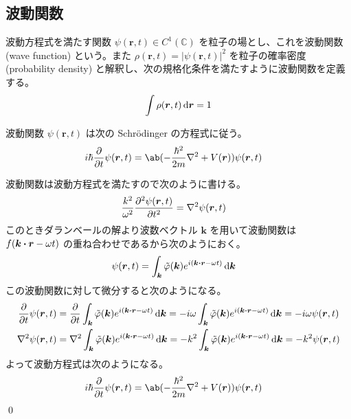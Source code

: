 \documentclass[uplatex,dvipdfmx,a4paper,11pt]{jlreq}
\makeatletter
\newcommand{\CC}{\mathbb{C}}
\newcommand{\rr}{\bm{r}}
\newcommand{\kk}{\bm{k}}
\numberwithin{equation}{section}
\theoremstyle{definition}
\renewenvironment{proof}[1][\proofname]{\par
  \normalfont
  \topsep6\p@\@plus6\p@ \trivlist
  \item[\hskip\labelsep{\bfseries #1}\@addpunct{\bfseries}]\ignorespaces\quad\par
}{%
  \qed\endtrivlist\@endpefalse
}
\renewcommand\proofname{証明}
\makeatother
\begin{document}
\subsection{波動関数}
\begin{definition}[波動関数]
  波動方程式を満たす関数 $\psi(\rr, t)\in C^1(\CC)$ を粒子の場とし、これを波動関数 (wave function) という。また $\rho(\rr, t) = |\psi(\rr, t)|^2$ を粒子の確率密度 (probability density) と解釈し、次の規格化条件を満たすように波動関数を定義する。
  \begin{align}
    \int\rho(\rr, t)\dl{\rr} = 1
  \end{align}
\end{definition}
\begin{theorem}
  波動関数 $\psi(\rr, t)$ は次の Schrödinger の方程式に従う。
  \begin{align}
    i\hbar\diffp{}{t}\psi(\rr, t) & = \ab(-\frac{\hbar^2}{2m}\nabla^2 + V(\rr))\psi(\rr, t)
  \end{align}
\end{theorem}
\begin{proof}
  波動関数は波動方程式を満たすので次のように書ける。
  \begin{align}
    \frac{k^2}{\omega^2}\pdv[2]{\psi(\rr, t)}{t} & = \nabla^2\psi(\rr, t)
  \end{align}
  このときダランベールの解より波数ベクトル $\kk$ を用いて波動関数は $f(\kk\vdot\rr - \omega t)$ の重ね合わせであるから次のようにおく。
  \begin{align}
    \psi(\rr, t) & = \int_{\kk}\tilde{\varphi}(\kk)e^{i(\kk\vdot\rr - \omega t)}\dl{\kk}
  \end{align}
  この波動関数に対して微分すると次のようになる。
  \begin{align}
    \diffp{}{t}\psi(\rr, t) & = \diffp{}{t}\int_{\kk}\tilde{\varphi}(\kk)e^{i(\kk\vdot\rr - \omega t)}\dl{\kk} = -i\omega\int_{\kk}\tilde{\varphi}(\kk)e^{i(\kk\vdot\rr - \omega t)}\dl{\kk} = -i\omega\psi(\rr, t) \\
    \nabla^2\psi(\rr, t)    & = \nabla^2\int_{\kk}\tilde{\varphi}(\kk)e^{i(\kk\vdot\rr - \omega t)}\dl{\kk} = -k^2\int_{\kk}\tilde{\varphi}(\kk)e^{i(\kk\vdot\rr - \omega t)}\dl{\kk} = -k^2\psi(\rr, t)
  \end{align}
  よって波動方程式は次のようになる。
  \begin{align}
    i\hbar\diffp{}{t}\psi(\rr, t) & = \ab(-\frac{\hbar^2}{2m}\nabla^2 + V(\rr))\psi(\rr, t)
  \end{align}
\end{proof}
\end{document}

